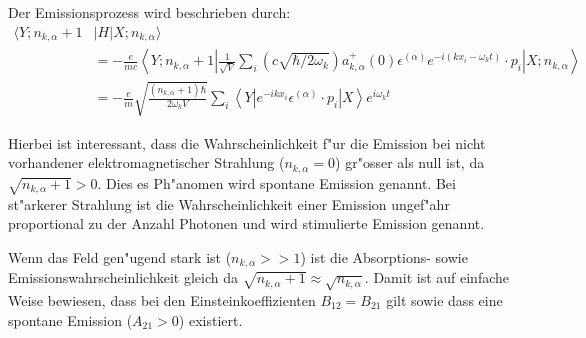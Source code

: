 Der Emissionsprozess wird beschrieben durch:
\begin{equation}
\begin{split}
\langle Y; n_{k,\alpha} + 1 &| H | X; n_{k,\alpha} \rangle \\
&= -\frac{e}{mc} \left\langle Y; n_{k,\alpha} + 1 \left| 
\frac{1}{\sqrt{V}} \sum_i \left(c \sqrt{\hbar/2 \omega_k}\right)a^+_{k,\alpha}(0) \epsilon^{(\alpha)} e^{-i(kx_i-\omega_k t)} \cdot p_i 
\right| X; n_{k,\alpha} \right\rangle\\
&= -\frac{e}{m} \sqrt{\frac{ (n_{k,\alpha}+1) \hbar}{2 \omega_k V}} \sum_i \left\langle Y \left| 
e^{-ikx_i} \epsilon^{(\alpha)} \cdot p_i 
\right| X \right\rangle e^{i\omega_k t}
\end{split}
\end{equation}

Hierbei ist interessant, dass die Wahrscheinlichkeit f"ur die Emission bei nicht vorhandener elektromagnetischer Strahlung ($n_{k,\alpha} = 0$) gr"osser als null ist, da $\sqrt{n_{k,\alpha}+1} > 0$. Dies es Ph"anomen wird spontane Emission genannt. Bei st"arkerer Strahlung ist die Wahrscheinlichkeit einer Emission ungef"ahr proportional zu der Anzahl Photonen und wird stimulierte Emission genannt.

Wenn das Feld gen"ugend stark ist ($n_{k,\alpha} >> 1$) ist die Absorptions- sowie Emissionswahrscheinlichkeit gleich da $\sqrt{n_{k,\alpha}+1} \approx \sqrt{n_{k,\alpha}}$. Damit ist auf einfache Weise bewiesen, dass bei den Einsteinkoeffizienten \cite{fq:einstein_koeff} $B_{12} = B_{21}$ gilt sowie dass eine spontane Emission ($A_{21} > 0$) existiert.